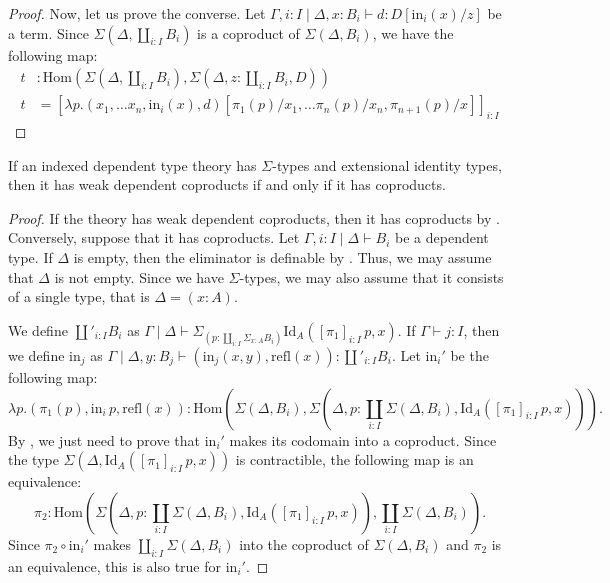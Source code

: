 \documentclass[reqno]{amsart}
\theoremstyle{definition}
\theoremstyle{remark}
\newcommand{\ob}{}
\newcommand{\fs}[1]{\mathrm{#1}}
\newcommand{\Hom}{\fs{Hom}}
\newcommand{\Id}{\fs{Id}}
\newcommand{\refl}{\fs{refl}}
\newcommand{\id}{\fs{id}}
\numberwithin{figure}{section}
\begin{document}
\begin{proof}
Now, let us prove the converse.
Let $\Gamma, i : I \mid \Delta, x : B_i \vdash d : D[\fs{in}_i(x)/z]$ be a term.
Since $\Sigma(\Delta, \coprod_{i : I} B_i)$ is a coproduct of $\Sigma(\Delta, B_i)$, we have the following map:
\begin{align*}
t & : \Hom(\Sigma(\Delta, \coprod_{i : I} B_i), \Sigma(\Delta, z : \coprod_{i : I} B_i, D)) \\
t & = [\lambda p.(x_1, \ldots x_n, \fs{in}_i(x), d)[\pi_1(p)/x_1, \ldots \pi_n(p)/x_n, \pi_{n+1}(p)/x]]_{i : I}
\end{align*}

\end{proof}

\begin{prop}
If an indexed dependent type theory has $\Sigma$-types and extensional identity types, then it has weak dependent coproducts if and only if it has coproducts.
\end{prop}
\begin{proof}
If the theory has weak dependent coproducts, then it has coproducts by .
Conversely, suppose that it has coproducts.
Let $\Gamma, i : I \mid \Delta \vdash B_i \ob$ be a dependent type.
If $\Delta$ is empty, then the eliminator is definable by .
Thus, we may assume that $\Delta$ is not empty.
Since we have $\Sigma$-types, we may also assume that it consists of a single type, that is $\Delta = (x : A)$.

We define $\coprod'_{i : I} B_i$ as $\Gamma \mid \Delta \vdash \Sigma_{(p : \coprod_{i : I} \Sigma_{x : A} B_i)} \Id_A([\pi_1]_{i : I}\,p, x) \ob$.
If $\Gamma \vdash j : I$, then we define $\fs{in}_j$ as $\Gamma \mid \Delta, y : B_j \vdash (\fs{in}_j(x,y), \refl(x)) : \coprod'_{i : I} B_i$.
Let $\fs{in}_i'$ be the following map:
\[ \lambda p. (\pi_1(p), \fs{in}_i\,p, \refl(x)) : \Hom(\Sigma(\Delta, B_i), \Sigma(\Delta, p : \coprod_{i : I} \Sigma(\Delta, B_i), \Id_A([\pi_1]_{i : I}\,p,x))). \]
By , we just need to prove that $\fs{in}_i'$ makes its codomain into a coproduct.
Since the type $\Sigma(\Delta, \Id_A([\pi_1]_{i : I}\,p,x))$ is contractible, the following map is an equivalence:
\[ \pi_2 : \Hom(\Sigma(\Delta, p : \coprod_{i : I} \Sigma(\Delta, B_i), \Id_A([\pi_1]_{i : I}\,p,x)), \coprod_{i : I} \Sigma(\Delta, B_i)). \]
Since $\pi_2 \circ \fs{in}_i'$ makes $\coprod_{i : I} \Sigma(\Delta, B_i)$ into the coproduct of $\Sigma(\Delta, B_i)$ and $\pi_2$ is an equivalence, this is also true for $\fs{in}_i'$.
\end{proof}
\end{document}
